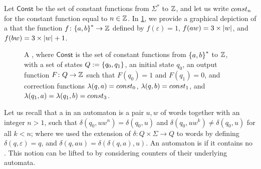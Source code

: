 \begin{example}
    \label{simple-transd:ex}
    Let $\mathsf{Const}$ be the set of constant functions from $\Sigma^*$ to $\mathbb{Z}$,
    and let us write $\const{n}$ for the constant function equal to $n \in \mathbb{Z}$.
    In 
    \cref{simple-transd:fig}, we provide a graphical depiction of a
     that  the function
    $f \colon \mathopen{\{} a,b \mathclose{\}}^* \to \mathbb{Z}$ defined by
    $f(\varepsilon) = 1$,
    $f(aw) = 3 \times \card{w}$,
    and $f(bw) = 3 \times \card{w} + 1$.
\end{example}

\begin{figure}
    \centering
    \caption{A , where $\mathsf{Const}$ is the set of constant functions
        from $\mathopen{\{} a,b \mathclose{\}}^*$ to $\mathbb{Z}$,
        with a set of states $Q \mathrel{:=} \mathopen{\{}  q_0, q_1  \mathclose{\}}$,
        an initial state $q_0$,
        an output function $F \colon Q \to \mathbb{Z}$ such that $F(q_0) = 1$ and $F(q_1) = 0$,
        and correction functions $\lambda(q,a) = \const{0}$, $\lambda(q,b) = \const{1}$,
        and $\lambda(q_1,a) = \lambda(q_1,b) = \const{3}$.
    }
    \label{simple-transd:fig}
\end{figure}

\AP Let us recall that a  in an automaton is a pair $u,w$ of
words together with an integer $n > 1$, such that $\delta(q_0, uw^n) =
\delta(q_0, u)$ and $\delta(q_0, u w^k) \neq \delta(q_0, u)$ for all $k < n$;
where we used the extension of $\delta \colon Q \times \Sigma \to Q$ to words
by defining $\delta(q, \varepsilon) = q$, and $\delta(q,au) =
\delta(\delta(q,a), u)$. An automaton is  if it contains
no . This notion can be lifted to
 by considering counters of their underlying
automata. 

